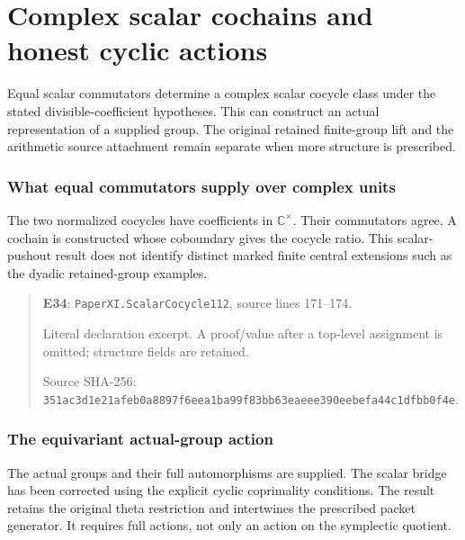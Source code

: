\documentclass[10pt,oneside]{book}
\begin{document}

\chapter{Complex scalar cochains and honest cyclic actions}
Equal scalar commutators determine a complex scalar cocycle class under the stated divisible-coefficient hypotheses. This can construct an actual representation of a supplied group. The original retained finite-group lift and the arithmetic source attachment remain separate when more structure is prescribed.

\subsection{What equal commutators supply over complex units}
\label{guide:E34}
The two normalized cocycles have coefficients in \(\mathbb C^\times\). Their commutators agree.
A cochain is constructed whose coboundary gives the cocycle ratio. This scalar-pushout result does not identify distinct marked finite central extensions such as the dyadic retained-group examples.

\begin{quote}\footnotesize\textbf{E34}: \nolinkurl{PaperXI.ScalarCocycle112}, source lines 171--174.\par Literal declaration excerpt. A proof/value after a top-level assignment is omitted; structure fields are retained.\par Source SHA-256: {\scriptsize\texttt{351ac3d1e21afeb0a8897f6eea1ba99f83bb63eaeee390eebefa44c1dfbb0f4e}}.\end{quote}


\subsection{The equivariant actual-group action}
\label{guide:E35}
The actual groups and their full automorphisms are supplied. The scalar bridge has been corrected using the explicit cyclic coprimality conditions.
The result retains the original theta restriction and intertwines the prescribed packet generator. It requires full actions, not only an action on the symplectic quotient.
\end{document}
